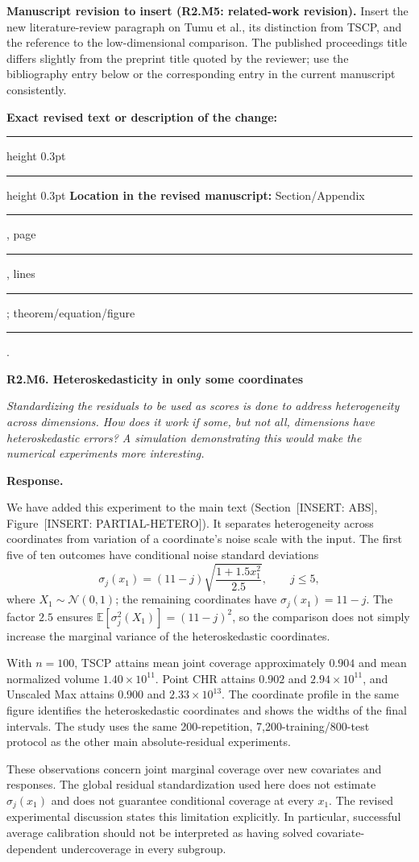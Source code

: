 \documentclass[11pt]{article}
\numberwithin{equation}{section}
\newcommand{\E}{\mathbb{E}}
\newcommand{\pending}[1]{\textcolor{AuthorRed}{[INSERT: #1]}}
\newcommand{\reviewercomment}[2]{%
  \par\medskip\noindent\textbf{#1}\par\nopagebreak
  \begingroup\color{ReviewerBlue}\itshape #2\par\endgroup
  \noindent\textbf{Response.} }
\newcommand{\revisionblock}[2]{%
  \par\begingroup\color{AuthorRed}\small
  \textbf{Manuscript revision to insert (#1).} #2\par
  \textbf{Exact revised text or description of the change:}\par
  \vspace{0.35em}\hrule height 0.3pt\vspace{1.4em}
  \hrule height 0.3pt\vspace{0.6em}
  \textbf{Location in the revised manuscript:}
  Section/Appendix \rule{1.3cm}{0.3pt},
  page \rule{1cm}{0.3pt},
  lines \rule{1.3cm}{0.3pt};
  theorem/equation/figure \rule{1.4cm}{0.3pt}.
  \par\endgroup}
\newcommand{\SecAbsolute}{Section~\pending{ABS}} %
\newcommand{\FigHeteroskedastic}{Figure~\pending{PARTIAL-HETERO}} %
\begin{document}
\revisionblock{R2.M5: related-work revision}{Insert the new
literature-review paragraph on Tumu et al., its distinction from
TSCP, and the reference to the low-dimensional comparison. The
published proceedings title differs slightly from the preprint title
quoted by the reviewer; use the bibliography entry below or the
corresponding entry in the current manuscript consistently.}

\reviewercomment{R2.M6. Heteroskedasticity in only some coordinates}{%
Standardizing the residuals to be used as scores is done to address
heterogeneity across dimensions. How does it work if some, but not
all, dimensions have heteroskedastic errors? A simulation
demonstrating this would make the numerical experiments more
interesting.}

We have added this experiment to the main text
(\SecAbsolute{}, \FigHeteroskedastic{}). It separates heterogeneity
across coordinates from variation of a coordinate's noise scale with
the input. The first five of ten outcomes have conditional noise
standard deviations
\begin{equation}
 \sigma_j(x_1)=(11-j)\sqrt{\frac{1+1.5x_1^2}{2.5}},
 \qquad j\leq5,
\end{equation}
where $X_1\sim\mathcal N(0,1)$; the remaining coordinates have
$\sigma_j(x_1)=11-j$. The factor $2.5$ ensures
$\E[\sigma_j^2(X_1)]=(11-j)^2$, so the comparison does not simply
increase the marginal variance of the heteroskedastic coordinates.

With $n=100$, TSCP attains mean joint coverage approximately $0.904$
and mean normalized volume $1.40\times10^{11}$. Point CHR attains
$0.902$ and $2.94\times10^{11}$, and Unscaled Max attains $0.900$
and $2.33\times10^{13}$. The coordinate profile in the same figure
identifies the heteroskedastic coordinates and shows the widths of
the final intervals. The study uses the same 200-repetition,
7,200-training/800-test protocol as the other main
absolute-residual experiments.

These observations concern joint marginal coverage over new
covariates and responses. The global residual standardization used
here does not estimate $\sigma_j(x_1)$ and does not guarantee
conditional coverage at every $x_1$. The revised experimental
discussion states this limitation explicitly. In particular,
successful average calibration should not be interpreted as having
solved covariate-dependent undercoverage in every subgroup.
\end{document}
